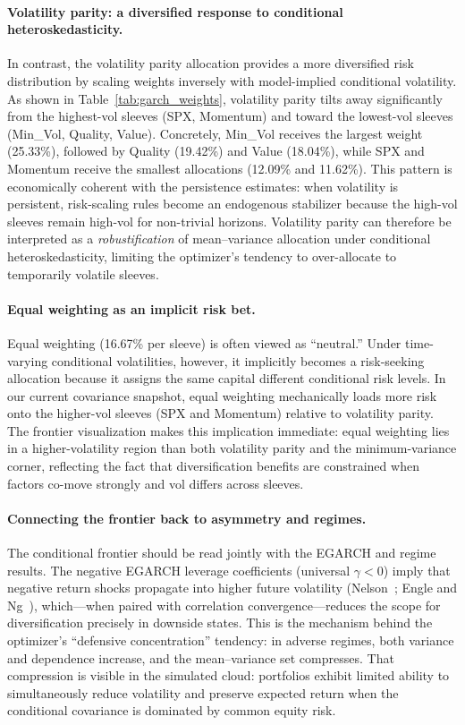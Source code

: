 \documentclass{article}
\begin{document}
\paragraph{Volatility parity: a diversified response to conditional heteroskedasticity.}
In contrast, the volatility parity allocation provides a more diversified risk distribution by scaling weights inversely with model-implied conditional volatility. As shown in Table~\ref{tab:garch_weights}, volatility parity tilts away significantly from the highest-vol sleeves (SPX, Momentum) and toward the lowest-vol sleeves (Min\_Vol, Quality, Value). Concretely, Min\_Vol receives the largest weight (25.33\%), followed by Quality (19.42\%) and Value (18.04\%), while SPX and Momentum receive the smallest allocations (12.09\% and 11.62\%). This pattern is economically coherent with the persistence estimates: when volatility is persistent, risk-scaling rules become an endogenous stabilizer because the high-vol sleeves remain high-vol for non-trivial horizons. Volatility parity can therefore be interpreted as a \emph{robustification} of mean--variance allocation under conditional heteroskedasticity, limiting the optimizer’s tendency to over-allocate to temporarily volatile sleeves.

\paragraph{Equal weighting as an implicit risk bet.}
Equal weighting (16.67\% per sleeve) is often viewed as ``neutral.'' Under time-varying conditional volatilities, however, it implicitly becomes a risk-seeking allocation because it assigns the same capital different conditional risk levels. In our current covariance snapshot, equal weighting mechanically loads more risk onto the higher-vol sleeves (SPX and Momentum) relative to volatility parity. The frontier visualization makes this implication immediate: equal weighting lies in a higher-volatility region than both volatility parity and the minimum-variance corner, reflecting the fact that diversification benefits are constrained when factors co-move strongly and vol differs across sleeves.

\paragraph{Connecting the frontier back to asymmetry and regimes.}
The conditional frontier should be read jointly with the EGARCH and regime results. The negative EGARCH leverage coefficients (universal $\gamma<0$) imply that negative return shocks propagate into higher future volatility (Nelson~\cite{nelson1991}; Engle and Ng~\cite{engle1993}), which—when paired with correlation convergence—reduces the scope for diversification precisely in downside states. This is the mechanism behind the optimizer’s ``defensive concentration'' tendency: in adverse regimes, both variance and dependence increase, and the mean--variance set compresses. That compression is visible in the simulated cloud: portfolios exhibit limited ability to simultaneously reduce volatility and preserve expected return when the conditional covariance is dominated by common equity risk.\newline
\end{document}
